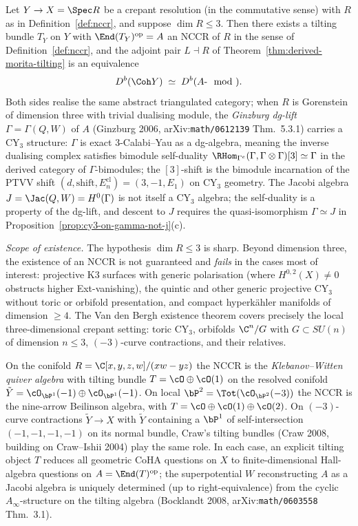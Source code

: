\begin{theorem}
\label{gl:thm:vdb-equivalence}
Let $Y \to X = \Spec R$ be a crepant resolution (in the
commutative sense) with $R$ as in Definition~\ref{def:nccr}, and suppose
$\dim R \leq 3$. Then there exists a tilting bundle $T_Y$ on $Y$ with
$\End(T_Y)^{\mathrm{op}} = A$ an NCCR of $R$ in the sense of
Definition~\ref{def:nccr}, and the adjoint pair $L \dashv R$ of
Theorem~\ref{thm:derived-morita-tilting} is an equivalence
\[
 D^{b}(\Coh Y) \;\simeq\; D^{b}(A\text{-}\mod).
\]
Both sides realise the same abstract triangulated category; when $R$ is
Gorenstein of dimension three with trivial dualising module, the
\emph{Ginzburg dg-lift} $\Gamma = \Gamma(Q, W)$ of $A$ (Ginzburg 2006,
arXiv:\texttt{math/0612139} Thm.~5.3.1) carries a CY$_{3}$ structure:
$\Gamma$ is exact $3$-Calabi--Yau as a dg-algebra, meaning the inverse
dualising complex satisfies bimodule self-duality
$\RHom_{\Gamma^e}(\Gamma, \Gamma \otimes \Gamma)[3] \simeq \Gamma$ in the
derived category of $\Gamma$-bimodules; the $[3]$-shift is the
bimodule incarnation of the PTVV shift $(d, \mathrm{shift}, E_n^{\mathrm{cl}})
= (3, -1, E_1)$ on CY$_3$ geometry. The Jacobi algebra
$J = \Jac(Q, W) = H^{0}(\Gamma)$ is not itself a CY$_3$ algebra; the
self-duality is a property of the dg-lift, and descent to $J$ requires
the quasi-isomorphism $\Gamma \simeq J$ in
Proposition~\ref{prop:cy3-on-gamma-not-j}(c).

\emph{Scope of existence.} The hypothesis $\dim R \leq 3$ is sharp. Beyond
dimension three, the existence of an NCCR is not guaranteed and \emph{fails}
in the cases most of interest: projective K3 surfaces with generic polarisation
(where $H^{0,2}(X) \neq 0$ obstructs higher Ext-vanishing), the quintic and
other generic projective CY$_3$ without toric or orbifold presentation, and
compact hyperk\"ahler manifolds of dimension $\geq 4$. The Van den Bergh
existence theorem covers precisely the local three-dimensional crepant setting:
toric CY$_3$, orbifolds $\C^n/G$ with $G \subset SU(n)$ of dimension $n \leq 3$,
$(-3)$-curve contractions, and their relatives.
\end{theorem}

On the conifold $R = \C[x,y,z,w]/(xw - yz)$ the NCCR is the \emph{Klebanov--Witten
quiver algebra} with tilting bundle $T = \cO \oplus \cO(1)$ on the resolved
conifold $\tilde Y = \cO_{\bP^1}(-1) \oplus \cO_{\bP^1}(-1)$. On local $\bP^2 =
\Tot(\cO_{\bP^2}(-3))$ the NCCR is the nine-arrow Beilinson algebra, with
$T = \cO \oplus \cO(1) \oplus \cO(2)$. On $(-3)$-curve contractions
$\tilde Y \to X$ with $\tilde Y$ containing a $\bP^1$ of self-intersection
$(-1,-1,-1,-1)$ on its normal bundle, Craw's tilting bundles (Craw
2008, building on Craw--Ishii 2004) play the same role. In each case, an
explicit tilting object $T$ reduces all geometric CoHA questions on $X$ to
finite-dimensional Hall-algebra questions on $A = \End(T)^{\mathrm{op}}$; the
superpotential $W$ reconstructing $A$ as a Jacobi algebra is uniquely
determined (up to right-equivalence) from the cyclic $A_\infty$-structure on
the tilting algebra (Bocklandt 2008, arXiv:\texttt{math/0603558} Thm.~3.1).

